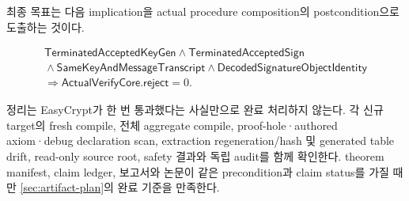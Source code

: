 최종 목표는 다음 implication을 actual procedure composition의 postcondition으로
도출하는 것이다.

\[
\begin{gathered}
  \mathsf{TerminatedAcceptedKeyGen}
  \land \mathsf{TerminatedAcceptedSign}\\
  {}\land \mathsf{SameKeyAndMessageTranscript}
  \land \mathsf{DecodedSignatureObjectIdentity}\\
  {}\Longrightarrow \mathsf{ActualVerifyCore.reject}=0.
\end{gathered}
\]

정리는 EasyCrypt가 한 번 통과했다는 사실만으로 완료 처리하지 않는다. 각 신규
target의 fresh  compile, 전체 aggregate compile, proof-hole·authored
axiom·debug declaration scan, extraction regeneration/hash 및 generated table drift,
read-only source root, safety 결과와 독립 audit를 함께 확인한다. theorem manifest,
claim ledger, 보고서와 논문이 같은 precondition과 claim status를 가질 때만
\cref{sec:artifact-plan}의 완료 기준을 만족한다.

